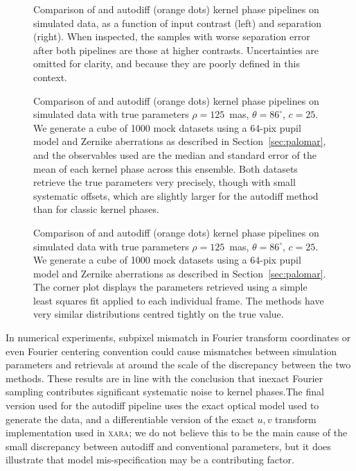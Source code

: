 \documentclass[modern]{aastex63}
\begin{document}
\begin{figure}
\caption{Comparison of \citet[][blue stars]{martinache20} and autodiff (orange dots) kernel phase pipelines on simulated data, as a function of input contrast (left) and separation (right). When inspected, the samples with worse separation error after both pipelines are those at higher contrasts. Uncertainties are omitted for clarity, and because they are poorly defined in this context. \label{method_comparison_ensemble}}
\end{figure}

\begin{figure}
\caption{Comparison of \citet[][blue stars]{martinache20} and autodiff (orange dots) kernel phase pipelines on simulated data with true parameters $\rho = 125$~mas, $\theta = 86^\circ$, $c=25$. We generate a cube of 1000 mock datasets using a 64-pix pupil model and Zernike aberrations as described in Section~\ref{sec:palomar}, and the observables used are the median and standard error of the mean of each kernel phase across this ensemble. Both datasets retrieve the true parameters very precisely, though with small systematic offsets, which are slightly larger for the autodiff method than for classic kernel phases. \label{comparison_posterior_sim}}
\end{figure}


\begin{figure}
\caption{Comparison of \citet[][blue stars]{martinache20} and autodiff (orange dots) kernel phase pipelines on simulated data with true parameters $\rho = 125$~mas, $\theta = 86^\circ$, $c=25$. We generate a cube of 1000 mock datasets using a 64-pix pupil model and Zernike aberrations as described in Section~\ref{sec:palomar}. The corner plot displays the parameters retrieved using a simple least squares fit applied to each individual frame. The methods have very similar distributions centred tightly on the true value. \label{comparison_posterior_sim_cube}}
\end{figure}

In numerical experiments, subpixel mismatch in Fourier transform coordinates or even Fourier centering convention could cause mismatches between simulation parameters and retrievals at around the scale of the discrepancy between the two methods.  These results are in line with the \citet{martinache_habilitation} conclusion that inexact Fourier sampling contributes significant systematic noise to kernel phases.The final version used for the autodiff pipeline uses the exact optical model used to generate the data, and a differentiable version of the exact $u,v$ transform implementation used in \textsc{xara}; we do not believe this to be the main cause of the small discrepancy between autodiff and conventional parameters, but it does illustrate that model mis-specification may be a contributing factor.
\end{document}
